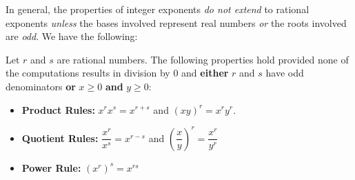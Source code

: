 \documentclass{ximera}
\begin{document}
\begin{multicols}{3}
% 
 

\end{multicols}

In general, the properties of integer exponents \textit{do not extend} to rational exponents \textit{unless} the bases involved represent  real numbers \textit{or} the roots involved are \textit{odd}.  We have the following:


\begin{theorem}  \label{exponentprops} Let $r$ and $s$ are rational numbers.  The following properties hold provided none of the computations results in division by $0$ and \textbf{either}  $r$ and $s$ have odd denominators  \textbf{or}  $x \geq 0$ \textbf{and} $y \geq 0$:

\begin{itemize}

\item \textbf{Product Rules:}  $x^{r} x^{s} = x^{r+s}$ and $(xy)^{r} = x^{r} y^{r}$.

\item \textbf{Quotient Rules:}  $\dfrac{x^{r}}{x^{s}} = x^{r-s}$ and $\left( \dfrac{x}{y}\right)^{r} = \dfrac{x^{r}}{y^{r}}$

\item \textbf{Power Rule:}  $(x^{r})^{s} = x^{rs}$

\end{itemize}

\end{theorem}
\end{document}
